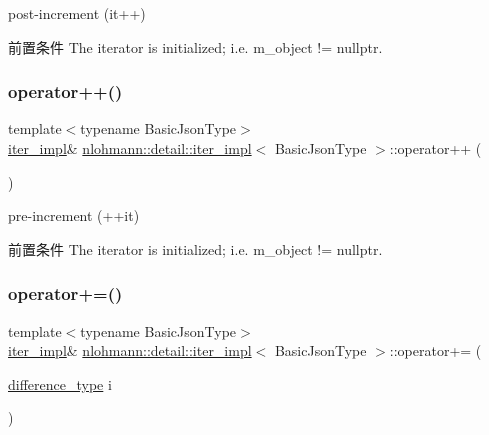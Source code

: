post-\/increment (it++) 

\begin{DoxyPrecond}{前置条件}
The iterator is initialized; i.\+e. {\ttfamily m\+\_\+object != nullptr}. 
\end{DoxyPrecond}
\mbox{\label{classnlohmann_1_1detail_1_1iter__impl_abdfe2a7f464400a7ab572782d14b922f}} 
\subsubsection{\texorpdfstring{operator++()}{operator++()}\hspace{0.1cm}{\footnotesize\ttfamily [2/2]}}
{\footnotesize\ttfamily template$<$typename Basic\+Json\+Type$>$ \\
\mbox{\hyperlink{classnlohmann_1_1detail_1_1iter__impl}{iter\+\_\+impl}}\& \mbox{\hyperlink{classnlohmann_1_1detail_1_1iter__impl}{nlohmann\+::detail\+::iter\+\_\+impl}}$<$ Basic\+Json\+Type $>$\+::operator++ (\begin{DoxyParamCaption}{ }\end{DoxyParamCaption})\hspace{0.3cm}{\ttfamily [inline]}}



pre-\/increment (++it) 

\begin{DoxyPrecond}{前置条件}
The iterator is initialized; i.\+e. {\ttfamily m\+\_\+object != nullptr}. 
\end{DoxyPrecond}
\mbox{\label{classnlohmann_1_1detail_1_1iter__impl_a3eef94f9d167046e7f773aeb6b78090c}} 
\subsubsection{\texorpdfstring{operator+=()}{operator+=()}}
{\footnotesize\ttfamily template$<$typename Basic\+Json\+Type$>$ \\
\mbox{\hyperlink{classnlohmann_1_1detail_1_1iter__impl}{iter\+\_\+impl}}\& \mbox{\hyperlink{classnlohmann_1_1detail_1_1iter__impl}{nlohmann\+::detail\+::iter\+\_\+impl}}$<$ Basic\+Json\+Type $>$\+::operator+= (\begin{DoxyParamCaption}\item[{\mbox{\hyperlink{classnlohmann_1_1detail_1_1iter__impl_a2f7ea9f7022850809c60fc3263775840}{difference\+\_\+type}}}]{i }\end{DoxyParamCaption})\hspace{0.3cm}{\ttfamily [inline]}}



